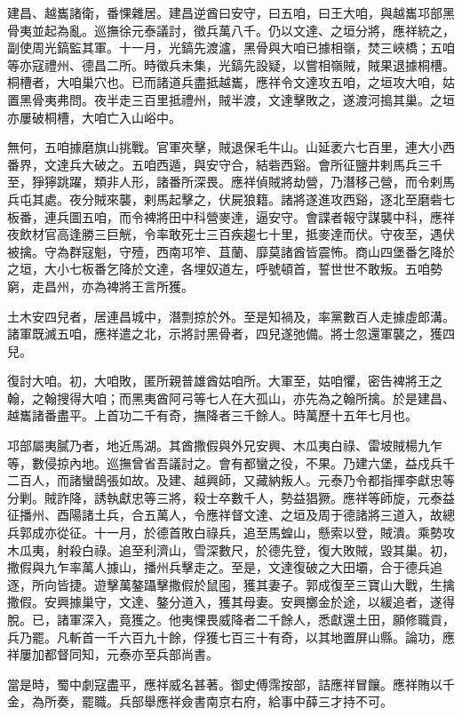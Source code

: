 \begin{pinyinscope}
建昌、越巂諸衛，番惈雜居。建昌逆酋曰安守，曰五咱，曰王大咱，與越巂邛部黑骨夷並起為亂。巡撫徐元泰議討，徵兵萬八千。仍以文達、之垣分將，應祥統之，副使周光鎬監其軍。十一月，光鎬先渡瀘，黑骨與大咱已據相嶺，焚三峽橋；五咱等亦寇禮州、德昌二所。時徵兵未集，光鎬先設疑，以嘗相嶺賊，賊果退據桐槽。桐槽者，大咱巢穴也。已而諸道兵盡抵越巂，應祥令文達攻五咱，之垣攻大咱，姑置黑骨夷弗問。夜半走三百里抵禮州，賊半渡，文達擊敗之，遂渡河搗其巢。之垣亦屢破桐槽，大咱亡入山峪中。

無何，五咱據磨旗山挑戰。官軍夾擊，賊退保毛牛山。山延袤六七百里，連大小西番界，文達兵大破之。五咱西遁，與安守合，結砦西谿。會所征鹽井剌馬兵三千至，猙獰跳躍，類非人形，諸番所深畏。應祥偵賊將劫營，乃潛移己營，而令剌馬兵屯其處。夜分賊來襲，剌馬起擊之，伏屍狼籍。諸將遂進攻西谿，逐北至磨砦七板番，連兵圖五咱，而令裨將田中科營麥達，逼安守。會諜者報守謀襲中科，應祥夜飲材官高逢勝三巨觥，令率敢死士三百疾趨七十里，抵麥達而伏。守夜至，遇伏被擒。守為群寇魁，守殪，西南邛笮、苴蘭、靡莫諸酋皆震怖。商山四堡番乞降於之垣，大小七板番乞降於文達，各埋奴道左，呼號頓首，誓世世不敢叛。五咱勢窮，走昌州，亦為裨將王言所獲。

土木安四兒者，居連昌城中，潛剽掠於外。至是知禍及，率黨數百人走據虛郎溝。諸軍既滅五咱，應祥遣之北，示將討黑骨者，四兒遂弛備。將士忽還軍襲之，獲四兒。

復討大咱。初，大咱敗，匿所親普雄酋姑咱所。大軍至，姑咱懼，密告裨將王之翰，之翰搜得大咱；而黑夷酋阿弓等七人在大孤山，亦先為之翰所擒。於是建昌、越巂諸番盡平。上首功二千有奇，撫降者三千餘人。時萬歷十五年七月也。

邛部屬夷膩乃者，地近馬湖。其酋撒假與外兄安興、木瓜夷白祿、雷坡賊楊九乍等，數侵掠內地。巡撫曾省吾議討之。會有都蠻之役，不果。乃建六堡，益戍兵千二百人，而諸蠻鴟張如故。及建、越興師，又藏納叛人。元泰乃令都指揮李獻忠等分剿。賊詐降，誘執獻忠等三將，殺士卒數千人，勢益猖獗。應祥等師旋，元泰益征播州、酉陽諸土兵，合五萬人，令應祥督文達、之垣及周于德諸將三道入，故總兵郭成亦從征。十一月，於德首敗白祿兵，追至馬蝗山，懸索以登，賊潰。乘勢攻木瓜夷，射殺白祿。追至利濟山，雪深數尺，於德先登，復大敗賊，毀其巢。初，撒假與九乍率萬人據山，播州兵擊走之。至是，文達復破之大田壩，合于德兵追逐，所向皆捷。遊擊萬鏊躡擊撒假於鼠囤，獲其妻子。郭成復至三寶山大戰，生擒撒假。安興據巢守，文達、鏊分道入，獲其母妻。安興擲金於途，以緩追者，遂得脫。已，諸軍深入，竟獲之。他夷惈畏威降者二千餘人，悉獻還土田，願修職貢，兵乃罷。凡斬首一千六百九十餘，俘獲七百三十有奇，以其地置屏山縣。論功，應祥屢加都督同知，元泰亦至兵部尚書。

當是時，蜀中劇寇盡平，應祥威名甚著。御史傅霈按部，詰應祥冒饟。應祥賄以千金，為所奏，罷職。兵部舉應祥僉書南京右府，給事中薛三才持不可。


\end{pinyinscope}
